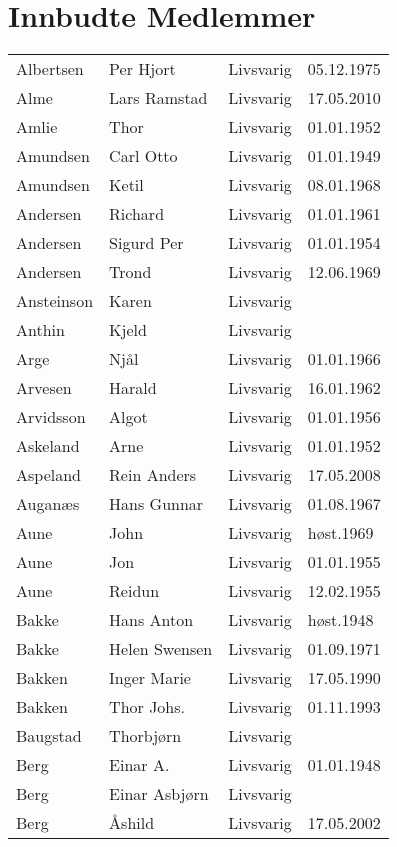 
\chapter*{Innbudte Medlemmer}

    \begin{longtable}{llll}
        Albertsen	&	Per Hjort	&	Livsvarig 	&	05.12.1975	\\
Alme	&	Lars Ramstad	&	Livsvarig	&	17.05.2010	\\
Amlie	&	Thor	&	Livsvarig 	&	01.01.1952	\\
Amundsen	&	Carl Otto	&	Livsvarig 	&	01.01.1949	\\
Amundsen	&	Ketil	&	Livsvarig 	&	08.01.1968	\\
Andersen	&	Richard	&	Livsvarig 	&	01.01.1961	\\
Andersen	&	Sigurd Per	&	Livsvarig 	&	01.01.1954	\\
Andersen	&	Trond	&	Livsvarig 	&	12.06.1969	\\
Ansteinson	&	Karen	&	Livsvarig 	&		\\
Anthin	&	Kjeld	&	Livsvarig 	&		\\
Arge	&	Njål	&	Livsvarig 	&	01.01.1966	\\
Arvesen	&	Harald	&	Livsvarig 	&	16.01.1962	\\
Arvidsson	&	Algot	&	Livsvarig 	&	01.01.1956	\\
Askeland	&	Arne	&	Livsvarig 	&	01.01.1952	\\
Aspeland	&	Rein Anders	&	Livsvarig	&	17.05.2008	\\
Auganæs	&	Hans Gunnar	&	Livsvarig 	&	01.08.1967	\\
Aune	&	John	&	Livsvarig 	&	høst.1969	\\
Aune	&	Jon	&	Livsvarig 	&	01.01.1955	\\
Aune	&	Reidun	&	Livsvarig 	&	12.02.1955	\\
Bakke	&	Hans Anton	&	Livsvarig	&	høst.1948	\\
Bakke	&	Helen Swensen	&	Livsvarig 	&	01.09.1971	\\
Bakken	&	Inger Marie	&	Livsvarig 	&	17.05.1990	\\
Bakken	&	Thor Johs.	&	Livsvarig 	&	01.11.1993	\\
Baugstad	&	Thorbjørn	&	Livsvarig 	&		\\
Berg	&	Einar A.	&	Livsvarig 	&	01.01.1948	\\
Berg	&	Einar Asbjørn	&	Livsvarig 	&		\\
Berg 	&	Åshild	&	Livsvarig	&	17.05.2002	\\

\end{longtable}
